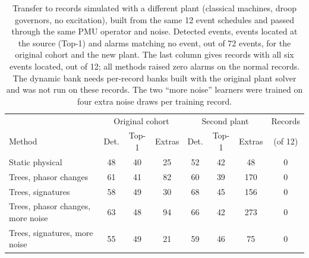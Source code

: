 \begin{table}[t]\centering\scriptsize\setlength{\tabcolsep}{1.5pt}
\caption{Transfer to records simulated with a different plant (classical machines, droop governors, no excitation), built from the same 12 event schedules and passed through the same PMU operator and noise. Detected events, events located at the source (Top-1) and alarms matching no event, out of 72 events, for the original cohort and the new plant. The last column gives records with all six events located, out of 12; all methods raised zero alarms on the normal records. The dynamic bank needs per-record banks built with the original plant solver and was not run on these records. The two ``more noise'' learners were trained on four extra noise draws per training record.}
\label{tab:second-plant}
\begin{tabular}{lccccccc}\toprule
 & \multicolumn{3}{c}{Original cohort} & \multicolumn{3}{c}{Second plant} & \multicolumn{1}{c}{Records} \\
Method & Det. & Top-1 & Extras & Det. & Top-1 & Extras & (of 12) \\\midrule
Static physical & 48 & 40 & 25 & 52 & 42 & 48 & 0 \\
Trees, phasor changes & 61 & 41 & 82 & 60 & 39 & 170 & 0 \\
Trees, signatures & 58 & 49 & 30 & 68 & 45 & 156 & 0 \\
Trees, phasor changes, more noise & 63 & 48 & 94 & 66 & 42 & 273 & 0 \\
Trees, signatures, more noise & 55 & 49 & 21 & 59 & 46 & 75 & 0 \\
\bottomrule\end{tabular}\end{table}
